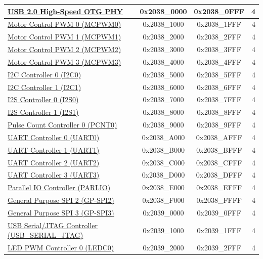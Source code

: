 \begin{ThreePartTable}
\begin{longtable}[c]{ |p{7cm}|c|c|r| }
    \hyperref[mod:usbotghs]{USB 2.0 High-Speed OTG PHY} & 0x2038\_0000 & 0x2038\_0FFF &   4\\\hline
    \hyperref[mod:mcpwm]{Motor Control PWM 0 (MCPWM0)} & 0x2038\_1000 & 0x2038\_1FFF &   4\\\hline
    \hyperref[mod:mcpwm]{Motor Control PWM 1 (MCPWM1)} & 0x2038\_2000 & 0x2038\_2FFF &   4\\\hline
    \hyperref[mod:mcpwm]{Motor Control PWM 2 (MCPWM2)} & 0x2038\_3000 & 0x2038\_3FFF &   4\\\hline
    \hyperref[mod:mcpwm]{Motor Control PWM 3 (MCPWM3)} & 0x2038\_4000 & 0x2038\_4FFF &   4\\\hline
    \hyperref[mod:i2c]{I2C Controller 0 (I2C0)} & 0x2038\_5000 & 0x2038\_5FFF &   4\\\hline
    \hyperref[mod:i2c]{I2C Controller 1 (I2C1)} & 0x2038\_6000 & 0x2038\_6FFF &   4\\\hline
    \hyperref[mod:i2s]{I2S Controller 0 (I2S0)} & 0x2038\_7000 & 0x2038\_7FFF &   4\\\hline
    \hyperref[mod:i2s]{I2S Controller 1 (I2S1)} & 0x2038\_8000 & 0x2038\_8FFF &   4\\\hline
    \hyperref[mod:pcnt]{Pulse Count Controller 0 (PCNT0)} & 0x2038\_9000 & 0x2038\_9FFF &   4\\\hline
    \hyperref[mod:uart]{UART Controller 0 (UART0)} & 0x2038\_A000 & 0x2038\_AFFF &   4\\\hline
    \hyperref[mod:uart]{UART Controller 1 (UART1)} & 0x2038\_B000 & 0x2038\_BFFF &   4\\\hline
    \hyperref[mod:uart]{UART Controller 2 (UART2)} & 0x2038\_C000 & 0x2038\_CFFF &   4\\\hline
    \hyperref[mod:uart]{UART Controller 3 (UART3)} & 0x2038\_D000 & 0x2038\_DFFF &   4\\\hline
    \hyperref[mod:parlio]{Parallel IO Controller (PARLIO)} & 0x2038\_E000 & 0x2038\_EFFF &   4\\\hline
    \hyperref[mod:spi]{General Purpose SPI 2 (GP-SPI2)} & 0x2038\_F000 & 0x2038\_FFFF &   4\\\hline
    \hyperref[mod:spi]{General Purpose SPI 3 (GP-SPI3)} & 0x2039\_0000 & 0x2039\_0FFF &   4\\\hline
    \hyperref[mod:usbserialjtag]{USB Serial/JTAG Controller (USB\_SERIAL\_JTAG)} & 0x2039\_1000 & 0x2039\_1FFF &   4\\\hline
    \hyperref[mod:ledpwm]{LED PWM Controller 0 (LEDC0)} & 0x2039\_2000 & 0x2039\_2FFF &   4\\\hline

\end{longtable}
\end{ThreePartTable}
